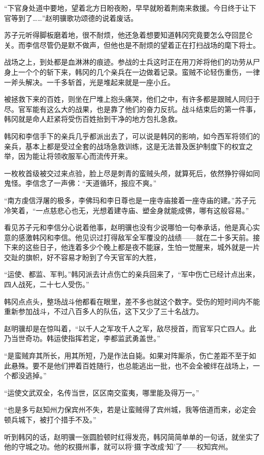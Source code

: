“下官身处道中要地，望着北方日盼夜盼，早早就盼着荆南来救援。今日终于让下官等到了……”赵明骥歌功颂德的说着废话。

苏子元听得脚板磨着地，很不耐烦，他还急着想要知道韩冈究竟要怎么夺回昆仑关。而李信尽管仍是默不做声，但他也是不耐烦的望着正在打扫战场的麾下将士。

战场之上，到处都是血淋淋的痕迹。参战的士兵这时正在用刀斧将他们的功劳从尸身上一个个的斩下来，韩冈的几个亲兵在一边做着记录。蛮贼不论轻伤重伤，一律一斧头解决。一千多斩首，光是堆起来就是一座小丘。

被拯救下来的百姓，则坐在尸堆上抱头痛哭，他们之中，有许多都是跟贼人同归于尽。官军能有这么大的战果，也是靠了他们的奋力反抗。战斗结束后的第一件事，韩冈就是命人赶紧将受伤百姓抬到干净的地方包扎急救。

韩冈和李信手下的亲兵几乎都派出去了，可以说是韩冈的影响，如今西军将领们的亲兵，基本上都是受过全套的战场急救训练，这是无法普及医护制度下的权宜之举，因为能让将领收服军心而流传开来。

一枚枚首级被交过来点验，脸上尽是刺青的蛮贼头颅，就算死后，依然狰狞得如同鬼怪。李信念了一声佛：“天道循环，报应不爽。”

“南方虔信浮屠的极多，李佛玛和李日尊也是一座寺庙接着一座寺庙的建。”苏子元冷笑着，“一点慈悲心也无，光想着建寺庙、塑金身就能成佛，哪有这般容易。”

看见苏子元和李信分心说着他事，赵明骥也没有少说哪怕一句奉承话，他是真心实意的感激韩冈和李信。他见识过打得敌军全军覆没的战绩——就在二十多天前。接下来的这些日子，他连着多少个晚上都是夜不能寐，生怕一觉醒来，城外就是一片交趾的旗帜，好不容易才盼到了今天官军的大胜，

“运使、都监、军判。”韩冈派去计点伤亡的亲兵回来了，“军中伤亡已经计点出来，四人战死，二十七人受伤。”

韩冈点点头，整场战斗他都看在眼里，差不多也就这个数字。受伤的短时间内不能重新参加战斗，不过八百多人的队伍，这下又少了三十名战力。

赵明骥却是在惊叫着，“以千人之军攻千人之军，敌尽授首，而官军只亡四人。此乃当世奇功。韩运使指挥若定，李都监武勇盖世。”

“是蛮贼弃其所长，用其所短，乃是作法自毙。如果对阵厮杀，伤亡差距不至于如此悬殊。要不是他们押着百姓随行，也总能逃出一批，也不会全被绊在战场上，一个都没逃掉。”

“运使文武双全，名传当世，区区南交蛮夷，哪里能及得万一。”

“也是多亏赵知州力保宾州不失，若是让蛮贼得了宾州城，我等倍道而来，必定会顿兵城下，被打个措手不及。”

听到韩冈的话，赵明骥一张圆脸顿时红得发亮，韩冈简简单单的一句话，就坐实了他的守城之功。他的权摄州事，就可以将‘摄’字改成‘知’了——权知宾州。

